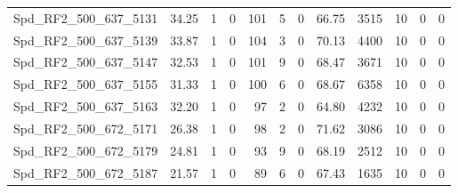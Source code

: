 \begin{longtable}[c]{@{}lrrrrrrrrrrr@{}}
Spd\_RF2\_500\_637\_5131     & 34.25                  & 1                       & 0                       & 101                    & 5                       & 0                       & 66.75                   & 3515                     & 10                       & 0                        & 0                        \\
Spd\_RF2\_500\_637\_5139     & 33.87                  & 1                       & 0                       & 104                    & 3                       & 0                       & 70.13                   & 4400                     & 10                       & 0                        & 0                        \\
Spd\_RF2\_500\_637\_5147     & 32.53                  & 1                       & 0                       & 101                    & 9                       & 0                       & 68.47                   & 3671                     & 10                       & 0                        & 0                        \\
Spd\_RF2\_500\_637\_5155     & 31.33                  & 1                       & 0                       & 100                    & 6                       & 0                       & 68.67                   & 6358                     & 10                       & 0                        & 0                        \\
Spd\_RF2\_500\_637\_5163     & 32.20                  & 1                       & 0                       & 97                     & 2                       & 0                       & 64.80                   & 4232                     & 10                       & 0                        & 0                        \\
Spd\_RF2\_500\_672\_5171     & 26.38                  & 1                       & 0                       & 98                     & 2                       & 0                       & 71.62                   & 3086                     & 10                       & 0                        & 0                        \\
Spd\_RF2\_500\_672\_5179     & 24.81                  & 1                       & 0                       & 93                     & 9                       & 0                       & 68.19                   & 2512                     & 10                       & 0                        & 0                        \\
Spd\_RF2\_500\_672\_5187     & 21.57                  & 1                       & 0                       & 89                     & 6                       & 0                       & 67.43                   & 1635                     & 10                       & 0                        & 0                        \\

\end{longtable}
